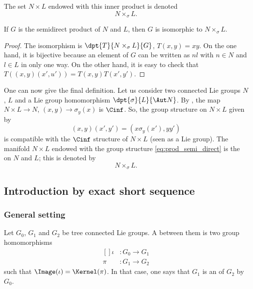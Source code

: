 The set $N\times L$ endowed with this inner product is denoted 
\[
   N\times_{\sigma}L.
\]

\begin{proposition}
If $G$ is the semidirect product of $N$ and $L$, then $G$ is isomorphic to $N\times_{\sigma} L$.
\end{proposition}

\begin{proof}
    The isomorphism is $\dpt{T}{N\times_{\sigma}L}{G}$, $T(x,y)=xy$. On the one hand, it is bijective because an element of $G$ can be written as $nl$ with $n\in N$ and $l\in L$ in only one way. On the other hand, it is easy to check that $T( (x,y)(x',u') )=T(x,y)T(x',y')$.
\end{proof}

One can now give the final definition. Let us consider two connected Lie groups $N$, $L$ and a Lie group  homomorphism $\dpt{\sigma}{L}{\Aut N}$. By , the map $N\times L\to N$, $(x,y)\to\sigma_y(x)$ is $\Cinf$. So, the group structure on $N\times L$ given by
\begin{equation}\label{eq:prod_semi_direct}
   (x,y)(x',y')=(x\sigma_y(x'),yy')
\end{equation}
is compatible with the $\Cinf$ structure of $N\times L$ (seen as a Lie group). The manifold $N\times L$ endowed with the group structure \eqref{eq:prod_semi_direct} is the  on $N$ and $L$; this is denoted by 
\[
   N\times_{\sigma}L.
\]

\subsection{Introduction by exact short sequence}

\subsubsection{General setting}

Let $G_0$, $G_1$ and $G_2$ be tree connected Lie groups. A  between them is two group homomorphisms
\begin{equation}
    \begin{aligned}[]
        \iota&\colon G_0\to G_1\\
        \pi&\colon G_1\to G_2
    \end{aligned}
\end{equation}
such that $\Image(\iota)=\Kernel(\pi)$. In that case, one says that $G_1$ is an  of $G_2$ by $G_0$.

